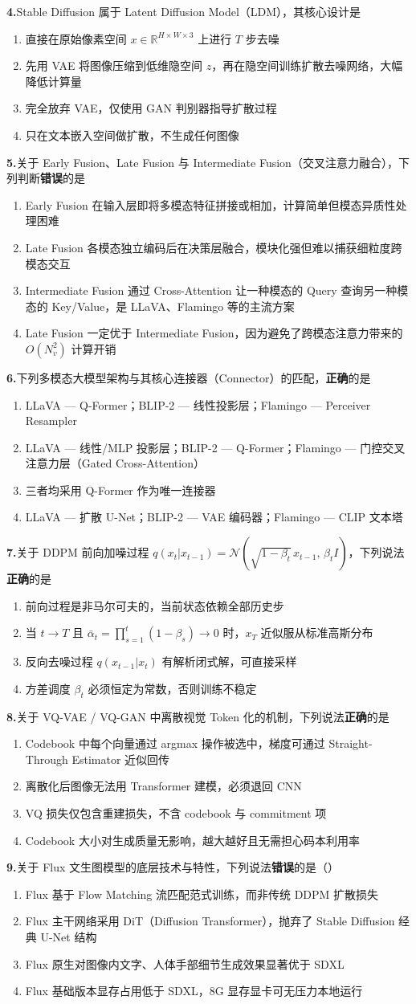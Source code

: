 \documentclass[11pt,a4paper]{article}
\newcommand{\qitem}[2]{%
  \noindent\textbf{#1.}\;#2\par
  \vspace{0.3em}
}
\newcommand{\fourchoices}[4]{%
  \begin{enumerate}[label=(\Alph*),leftmargin=2.2em,itemsep=0pt,parsep=0pt,topsep=0pt]
    \setlength{\itemindent}{0pt}
    \item #1
    \item #2
    \item #3
    \item #4
  \end{enumerate}
  \vspace{0.4em}
}
\begin{document}
\qitem{4}{Stable Diffusion 属于 Latent Diffusion Model（LDM），其核心设计是}{}
\fourchoices{直接在原始像素空间 $x\in\mathbb{R}^{H\times W\times 3}$ 上进行 $T$ 步去噪}{先用 VAE 将图像压缩到低维隐空间 $z$，再在隐空间训练扩散去噪网络，大幅降低计算量}{完全放弃 VAE，仅使用 GAN 判别器指导扩散过程}{只在文本嵌入空间做扩散，不生成任何图像}

\needspace{1cm}

\qitem{5}{关于 Early Fusion、Late Fusion 与 Intermediate Fusion（交叉注意力融合），下列判断\textbf{错误}的是}{}
\fourchoices{Early Fusion 在输入层即将多模态特征拼接或相加，计算简单但模态异质性处理困难}{Late Fusion 各模态独立编码后在决策层融合，模块化强但难以捕获细粒度跨模态交互}{Intermediate Fusion 通过 Cross-Attention 让一种模态的 Query 查询另一种模态的 Key/Value，是 LLaVA、Flamingo 等的主流方案}{Late Fusion 一定优于 Intermediate Fusion，因为避免了跨模态注意力带来的 $O(N_v^2)$ 计算开销}

\qitem{6}{下列多模态大模型架构与其核心连接器（Connector）的匹配，\textbf{正确}的是}{}
\fourchoices{LLaVA — Q-Former；BLIP-2 — 线性投影层；Flamingo — Perceiver Resampler}{LLaVA — 线性/MLP 投影层；BLIP-2 — Q-Former；Flamingo — 门控交叉注意力层（Gated Cross-Attention）}{三者均采用 Q-Former 作为唯一连接器}{LLaVA — 扩散 U-Net；BLIP-2 — VAE 编码器；Flamingo — CLIP 文本塔}

\qitem{7}{关于 DDPM 前向加噪过程 $q(x_t|x_{t-1})=\mathcal{N}(\sqrt{1-\beta_t}\,x_{t-1},\,\beta_t I)$，下列说法\textbf{正确}的是}{}
\fourchoices{前向过程是非马尔可夫的，当前状态依赖全部历史步}{当 $t\to T$ 且 $\bar\alpha_t=\prod_{s=1}^{t}(1-\beta_s)\to 0$ 时，$x_T$ 近似服从标准高斯分布}{反向去噪过程 $q(x_{t-1}|x_t)$ 有解析闭式解，可直接采样}{方差调度 $\beta_t$ 必须恒定为常数，否则训练不稳定}

\qitem{8}{关于 VQ-VAE / VQ-GAN 中离散视觉 Token 化的机制，下列说法\textbf{正确}的是}{}
\fourchoices{Codebook 中每个向量通过 argmax 操作被选中，梯度可通过 Straight-Through Estimator 近似回传}{离散化后图像无法用 Transformer 建模，必须退回 CNN}{VQ 损失仅包含重建损失，不含 codebook 与 commitment 项}{Codebook 大小对生成质量无影响，越大越好且无需担心码本利用率}

\qitem{9}{关于 Flux 文生图模型的底层技术与特性，下列说法\textbf{错误}的是（\quad）}{}
\fourchoices{Flux 基于 Flow Matching 流匹配范式训练，而非传统 DDPM 扩散损失}{Flux 主干网络采用 DiT（Diffusion Transformer），抛弃了 Stable Diffusion 经典 U-Net 结构}{Flux 原生对图像内文字、人体手部细节生成效果显著优于 SDXL}{Flux 基础版本显存占用低于 SDXL，8G 显存显卡可无压力本地运行}
\end{document}
